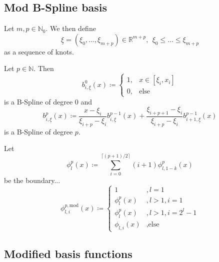 \documentclass[
  a4paper,  %
  twoside,  %
  bibliography=totoc,
  headsepline,
  cleardoublepage=empty,
  parskip=half,
  draft=false
]{scrbook}
\begin{document}
\subsection{Mod B-Spline basis}

\begin{definition}[Knots]
Let $m,p \in \mathds{N}_0$.
We then define
\begin{equation}
\underline{\xi}=(\xi_0, \dots, \xi_{m + p}) \in \mathds{R}^{m + p}, ~~ \xi_0 \leq \dots \leq \xi_{m + p}
\end{equation}
as a sequence of knots.
\end{definition}

\begin{definition}[B-Splines]
Let $p \in \mathds{N}$.
Then
\begin{equation}
b^0_{i,\underline{\xi}}(x) \coloneqq
\begin{cases}
    1, & x \in [\xi_i,x_i] \\
   0, & \text{else}
\end{cases}
\end{equation}
is a B-Spline of degree $0$ and
\begin{equation}
b_{i,\underline{\xi}}^p(x) \coloneqq \frac{x - \xi_i}{\xi_{i + p} - \xi_i} b_{i,\underline{\xi}}^{p-1}(x) + \frac{\xi_{i+p+1} - \xi_i}{\xi_{i + p} - \xi_i} b_{i+1,\underline{\xi}}^{p-1}(x) 
\end{equation}
is a B-Spline of degree $p$.
\end{definition}

\begin{definition}
Let
\begin{equation}
\phi_l^p(x) \coloneqq \sum_{i=0}^{\lceil (p+1)/2 \rceil} (i+1) \phi^p_{l,1-k}(x)
\end{equation}
be the boundary...
\begin{equation}
\phi^{p,\text{mod}}_{l,i}(x) \coloneqq
\begin{cases}
1 &, l=1\\
\phi^p_{l}(x)&, l>1, i=1\\
\phi^p_{l}(x)&, l>1, i=2^l - 1\\
\phi_{l,i}(x)&, \text{else}
\end{cases}
\nonumber
\end{equation}
\end{definition}


\subsection{Modified basis functions}
\end{document}

